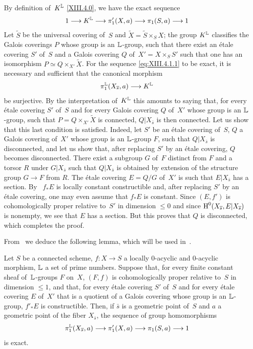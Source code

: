 By
definition of~$K^{\mathbb{L}}$ \eqref{XIII.4.0}, we have the exact sequence
$$
1\to K^{\LL} \to \pi_1'(X,a)\to \pi_1(S,a)\to 1
$$
Let $\widetilde{S}$ be the universal covering of~$S$ and
$\widetilde{X}=\widetilde{S}\times_SX$; the group $K^{\mathbb{L}}$ classifies the
Galois coverings $P$ whose group is an $\mathbb{L}$-group, such that there
exist an \'etale covering $S'$ of~$S$ and a Galois covering
$Q$ of~$X'=X\times_SS'$ such that one has an isomorphism
$P\simeq Q\times_{X'}\widetilde{X}$. For the sequence
\eqref{eq:XIII.4.1.1} to be exact, it is necessary and sufficient that the
canonical morphism
$$
\pi_1^{\LL}(X_{\bar{s}},a)\to K^{\LL}
$$
be surjective. By the interpretation of~$K^{\mathbb{L}}$ this
amounts to saying that, for every \'etale covering $S'$ of~$S$
and for every Galois covering $Q$ of~$X'$ whose group is an
$\mathbb{L}$-group, such that $P=Q\times_{X'}\widetilde{X}$ is connected,
$Q|X_{\bar{s}}$ is then connected. Let us show that this last
condition is satisfied. Indeed, let $S'$ be an \'etale
covering of~$S$, $Q$ a Galois covering of~$X'$ whose group is an
$\mathbb{L}$-group $F$, such that $Q|X_{\bar{s}}$ is disconnected, and let us show
that, after replacing $S'$ by an \'etale covering, $Q$
becomes disconnected. There exist a subgroup $G$ of~$F$ distinct from
$F$ and a torsor $R$ under $G|X_{\bar{s}}$ such that $Q|X_{\bar{s}}$
is obtained by extension of the structure group $G\to F$ from
$R$. The \'etale covering $E=Q/G$ of~$X'$ is such that
$E|X_{\bar{s}}$ has a section. By~ $f_*E$
is locally constant constructible and, after replacing $S'$
by an \'etale covering, one may even assume that $f_*E$
is constant. Since $(E,f')$ is cohomologically proper relative
to~$S'$ in dimension $\leqslant0$ and since $\operatorname{H}^0(X_{\overline{s}},
E|X_{\overline{s}})$ is nonempty, we see that $E$ has a section. But this
proves that $Q$ is disconnected, which completes the proof.

From~ we deduce the following lemma, which will be used
in~.

\begin{lemma}
\label{XIII.4.2}
Let $S$ be a connected scheme, $f\colon X\to S$ a
locally $0$-acyclic and $0$-acyclic morphism, $\mathbb{L}$ a set of
prime numbers. Suppose
that, for every finite constant sheaf of~$\mathbb{L}$-groups $F$ on~$X$,
$(F,f)$ is cohomologically proper relative to~$S$ in
dimension $\leqslant1$, and that, for every \'etale covering
$S'$ of~$S$ and for every \'etale covering $E$ of~$X'$
that is a quotient of a Galois covering whose group is an $\mathbb{L}$-group,
$f'_*E$ is constructible. Then, if $\bar{s}$ is a
geometric point of~$S$ and $a$ a geometric point of the
fiber $X_{\bar{s}}$, the sequence of group homomorphisms
$$
\pi_1^{\LL}(X_{\bar{s}},a)\to\pi_1'(X,a)\to\pi_1(S,a)\to1
$$
is exact.
\end{lemma}

